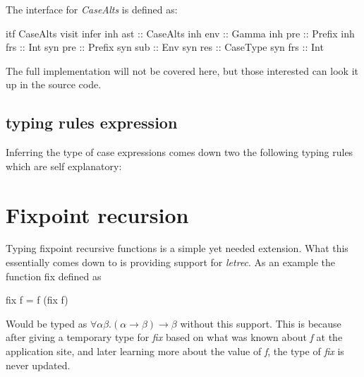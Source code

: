 The interface for \emph{CaseAlts} is defined as:
\begin{code}
itf CaseAlts
  visit infer
    inh ast  :: CaseAlts
    inh env  :: Gamma
    inh pre  :: Prefix
    inh frs  :: Int
    syn pre  :: Prefix
    syn sub  :: Env
    syn res  :: CaseType
    syn frs  :: Int 
\end{code}

The full implementation will not be covered here, but those interested can look it up in the source code.

\subsection{typing rules expression}
Inferring the type of case expressions comes down two the following typing rules which are self explanatory:

\begin{prooftree}
\end{prooftree}

\begin{prooftree}
\end{prooftree} 
\section{Fixpoint recursion}
Typing fixpoint recursive functions is a simple yet needed extension. What this essentially comes down to is providing support for \emph{letrec}. As an example the function fix defined as

\begin{code}
fix f = f (fix f)
\end{code} 

Would be typed as $\forall \alpha \beta. (\alpha \rightarrow \beta) \rightarrow \beta$ without this support. This is because after giving a temporary type for \emph{fix} based on what was known about \emph{f} at the application site, and later learning more about the value of \emph{f}, the type of \emph{fix} is never updated.

